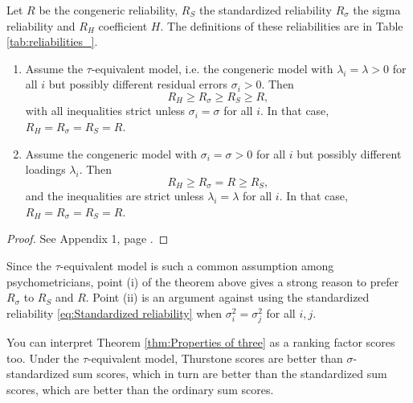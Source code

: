 \documentclass[twoside]{article}
\begin{document}
\begin{thm}
\label{thm:Properties of three} Let $ R$ be the congeneric
reliability, $ R_{S}$ the standardized reliability 
$ R_{\sigma}$ the sigma reliability 
and $ R_{H}$ coefficient $H$. The definitions of these reliabilities are in Table \ref{tab:reliabilities_}.

\begin{enumerate}[label=(\roman*)]
\item Assume the $\tau$-equivalent model,
i.e. the congeneric model with $\lambda_{i}=\lambda>0$ for all $i$
but possibly different residual errors $\sigma_{i}>0$. Then
\[
 R_{H}\geq R_{\sigma}\geq R_{S}\geq R,
\]
with all inequalities strict unless $\sigma_{i}=\sigma$ for all
$i$. In that case, $ R_{H} =  R_{\sigma} =  R_{S} =  R$.
\item Assume the congeneric model with $\sigma_i = \sigma > 0$ for all $i$ but possibly different loadings $\lambda_i$. Then
\[
 R_{H}\geq R_{\sigma}= R\geq R_{S},
\]
and the inequalities are strict unless $\lambda_{i}=\lambda$ for all
$i$. In that case, $ R_{H} =  R_{\sigma} =  R_{S} =  R$.

\end{enumerate}

\end{thm}
\begin{proof}
See Appendix 1, page \pageref{proof:Properties}.
\end{proof}

Since the $\tau$-equivalent model is such a common assumption among psychometricians, point (i) of the theorem above gives a strong reason to prefer $ R_{\sigma}$ to $ R_S$ and $ R$. Point (ii) is an argument against using the standardized reliability \eqref{eq:Standardized reliability} when $\sigma_{i}^{2}=\sigma_j^{2}$ for all $i,j$.

You can interpret Theorem \ref{thm:Properties of three} as a ranking factor scores too. Under the $\tau$-equivalent model, Thurstone scores are better than $\sigma$-standardized sum scores, which in turn are better than the standardized sum scores, which are
better than the ordinary sum scores.
\end{document}
